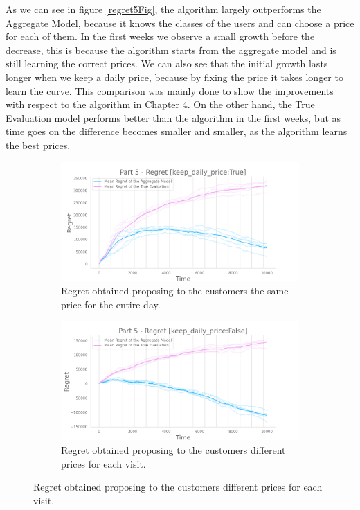 As we can see in figure \ref{regret5Fig}, the algorithm largely outperforms the Aggregate Model, because it knows the classes of the users and can choose a price for each of them.
In the first weeks we observe a small growth before the decrease, this is because the algorithm starts from the aggregate model and is still learning the correct prices.
We can also see that the initial growth lasts longer when we keep a daily price, because by fixing the price it takes longer to learn the curve.
This comparison was mainly done to show the improvements with respect to the algorithm in Chapter 4.
On the other hand, the True Evaluation model performs better than the algorithm in the first weeks, but as time goes on the difference becomes smaller and smaller, as the algorithm learns the best prices.

\begin{figure}[!htb]
	\centering

	\begin{subfigure}[!H]{0.8\textwidth}
		\centering
		\includegraphics[width=\textwidth]{images/part5_keep-daily-priceTrue.png}
		\caption{Regret obtained proposing to the customers the same price for the entire day.}
	\end{subfigure}

	\begin{subfigure}[!H]{0.8\textwidth}
		\centering
		\includegraphics[width=\textwidth]{images/part5_keep-daily-priceFalse.png}
		\caption{Regret obtained proposing to the customers different prices for each visit.}
	\end{subfigure}


\end{figure}
